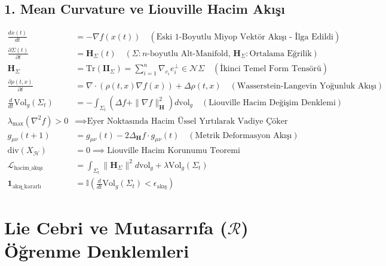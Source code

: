 \documentclass[11pt, a4paper]{article}
\begin{document}
\subsection{1. Mean Curvature ve Liouville Hacim Akışı}
\begin{align}
\frac{dx(t)}{dt} &= -\nabla f(x(t)) \quad (\text{Eski 1-Boyutlu Miyop Vektör Akışı - İlga Edildi}) \\
\frac{\partial \Sigma(t)}{\partial t} &= \mathbf{H}_{\Sigma}(t) \quad (\Sigma: n\text{-boyutlu Alt-Manifold, } \mathbf{H}_{\Sigma}: \text{Ortalama Eğrilik}) \\
\mathbf{H}_{\Sigma} &= \text{Tr}(\mathbf{II}_{\Sigma}) = \sum_{i=1}^n \nabla_{e_i} e_i^{\bot} \in \mathcal{N}\Sigma \quad (\text{İkinci Temel Form Tensörü}) \\
\frac{\partial \rho(t, x)}{\partial t} &= \nabla \cdot (\rho(t, x) \nabla f(x)) + \Delta \rho(t, x) \quad (\text{Wasserstein-Langevin Yoğunluk Akışı}) \\
\frac{d}{dt} \text{Vol}_g(\Sigma_t) &= -\int_{\Sigma_t} \left( \Delta f + \|\nabla f\|_{\mathbf{H}}^2 \right) d\text{vol}_g \quad (\text{Liouville Hacim Değişim Denklemi}) \\
\lambda_{\max}(\nabla^2 f) > 0 &\implies \text{Eyer Noktasında Hacim Üssel Yırtılarak Vadiye Çöker} \\
g_{\mu\nu}(t+1) &= g_{\mu\nu}(t) - 2 \Delta_{\mathbf{H}} f \cdot g_{\mu\nu}(t) \quad (\text{Metrik Deformasyon Akışı}) \\
\text{div}(X_{\mathcal{H}}) &= 0 \implies \text{Liouville Hacim Korunumu Teoremi} \\
\mathcal{L}_{\text{hacim\_akışı}} &= \int_{\Sigma_t} \|\mathbf{H}_{\Sigma}\|^2 d\text{vol}_g + \lambda \text{Vol}_g(\Sigma_t) \\
\mathbf{1}_{\text{akış\_kararlı}} &= \mathbb{I}\left( \frac{d}{dt} \text{Vol}_g(\Sigma_t) < \epsilon_{\text{akış}} \right)
\end{align}

\section{Lie Cebri ve Mutasarrıfa ($\mathcal{R}$) Öğrenme Denklemleri}
\end{document}
